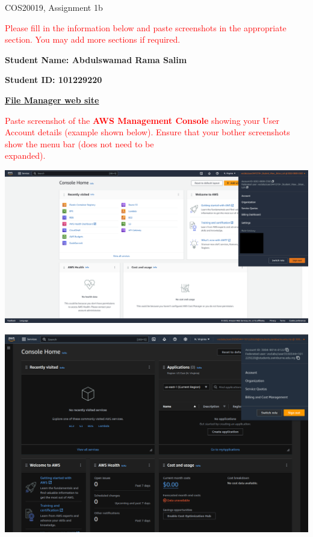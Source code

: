 \documentclass[11pt]{article}
\begin{document}
\noindent COS20019, Assignment 1b

\vspace{0.8cm}

\noindent\textcolor{red}{Please fill in the information below and paste screenshots in the appropriate section. You may add more sections if required.}

\vspace{0.4cm}

\noindent\textbf{Student Name: Abdulswamad Rama Salim} 

\vspace{0.45cm}

\noindent\textbf{Student ID\@: 101229220}

\vspace{1.2cm}

\noindent\underline{\textbf{File Manager web site}}

\vspace{0.6cm}

\noindent\textcolor{red}{Paste screenshot of the \textbf{AWS Management Console} showing your User Account details (example shown below). Ensure that your bother screenshots show the menu bar (does not need to be\\ expanded).}

\vspace{0.6cm}


{\centering
\includegraphics[width=6.2in]{pics/pic.png}}

{\centering
\includegraphics[width=6.2in]{pics/0.png}}
\end{document}
